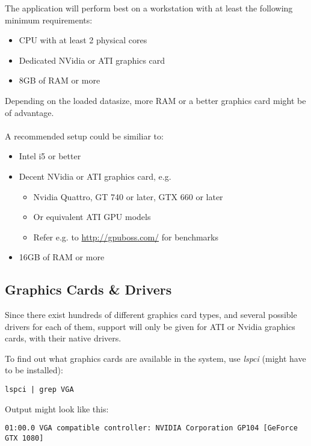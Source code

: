 The application will perform best on a workstation with at least the following minimum requirements:

\begin{itemize}  
\item CPU with at least 2 physical cores
\item Dedicated NVidia or ATI graphics card
\item 8GB of RAM or more
\end{itemize}

Depending on the loaded datasize, more RAM or a better graphics card might be of advantage. \\\\

A recommended setup could be similiar to:

\begin{itemize}  
\item Intel i5 or better
\item Decent NVidia or ATI graphics card, e.g.
\begin{itemize}  
\item Nvidia Quattro, GT 740 or later, GTX 660 or later
\item Or equivalent ATI GPU models
\item Refer e.g. to \url{http://gpuboss.com/} for benchmarks
\end{itemize}
\item 16GB of RAM or more
\end{itemize}

\subsection{Graphics Cards \& Drivers}

Since there exist hundreds of different graphics card types, and several possible drivers for each of them, support will only be given for ATI or Nvidia graphics cards, with their native drivers.

To find out what graphics cards are available in the system, use \textit{lspci} (might have to be installed):

\begin{verbatim}
lspci | grep VGA
\end{verbatim}

Output might look like this:

\begin{verbatim}
01:00.0 VGA compatible controller: NVIDIA Corporation GP104 [GeForce GTX 1080]
\end{verbatim}

